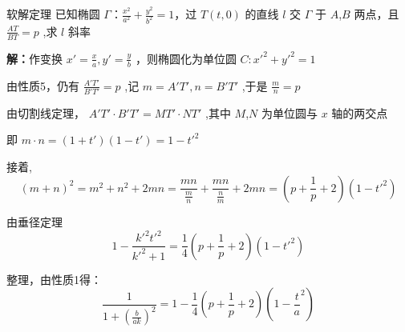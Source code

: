 \begin{corollary}{软解定理}
已知椭圆 \(\Gamma：\frac{x^2}{a^2}+\frac{y^2}{b^2}=1\)，过 \(T(t,0)\) 的直线 \(l\) 交 \(\Gamma\) 于 \(A\),\(B\) 两点，且 \(\frac{AT}{BT}=p\) ,求 \(l\) 斜率

\textbf{解：}作变换 \(x'=\frac{x}{a},y'=\frac{y}{b}\) ，则椭圆化为单位圆 \(C:x'^2+y'^2=1\)

由性质5，仍有 \(\frac{A'T'}{B'T'}=p\) ,记 \(m=A'T',n=B'T'\) ,于是 \(\frac{m}{n}=p\) 

由切割线定理， \(A'T'\cdot B'T'=MT'\cdot NT'\) ,其中 \(M\),\(N\) 为单位圆与 \(x\) 轴的两交点

即 \(m\cdot n=(1+t')(1-t')=1-t'^2\) 

接着,
$$(m+n)^2=m^2+n^2+2mn=\frac{mn}{\frac{m}{n}}+\frac{mn}{\frac{n}{m}}+2mn=\left(p+\frac{1}{p}+2\right)(1-t'^2)$$

由垂径定理
$$1-\frac{k'^2t'^2}{k'^2+1}=\frac{1}{4}\left(p+\frac{1}{p}+2\right)(1-t'^2)$$ 

整理，由性质1得：
$$\frac{1}{1+(\frac{b}{ak})^2}=1-\frac{1}{4}\left(p+\frac{1}{p}+2\right)\left(1-\frac{t}{a}^2\right)$$ 

\end{corollary}

